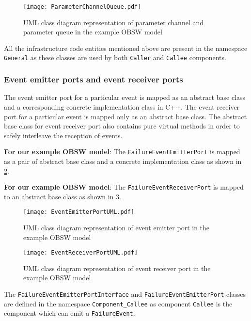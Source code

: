 \begin{figure}[h]
	\centering
	\texttt{[image: ParameterChannelQueue.pdf]}
	\caption{UML class diagram representation of parameter channel and parameter queue in the example OBSW model}
	\label{fig: Parameter channel UML}
\end{figure}

All the infrastructure code entities mentioned above are present in the namespace \texttt{General} as these classes are used by both \texttt{Caller} and \texttt{Callee} components.   

\subsubsection{\textbf{Event emitter ports and event receiver ports}}
The event emitter port for a particular event is mapped as an abstract base class and a corresponding concrete implementation class in C++. The event receiver port for a particular event is mapped only as an abstract base class. The abstract base class for event receiver port also contains pure virtual methods in order to safely interleave the reception of events.  

\textbf{For our example OBSW model}: The \texttt{FailureEvent\allowbreak EmitterPort} is mapped as a pair of abstract base class and a concrete implementation class as shown in \cref{fig: Event emitter port UML}.  

\textbf{For our example OBSW model}: The \texttt{FailureEvent\allowbreak ReceiverPort} is mapped to an abstract base class as shown in \cref{fig: Event receiver port UML}.

\begin{figure}[h]
	\centering
	\texttt{[image: EventEmitterPortUML.pdf]}
	\caption{UML class diagram representation of event emitter port in the example OBSW model}
	\label{fig: Event emitter port UML}
\end{figure}

\begin{figure}[h]
	\centering
	\texttt{[image: EventReceiverPortUML.pdf]}
	\caption{UML class diagram representation of event receiver port in the example OBSW model}
	\label{fig: Event receiver port UML}
\end{figure} 

The \texttt{FailureEvent\allowbreak Emitter\allowbreak Port\allowbreak Interface} and \texttt{FailureEvent\allowbreak Emitter\allowbreak Port} classes are defined in the namespace \texttt{Component\allowbreak \_Callee} as component \texttt{Callee} is the component which can emit a \texttt{FailureEvent}. 

